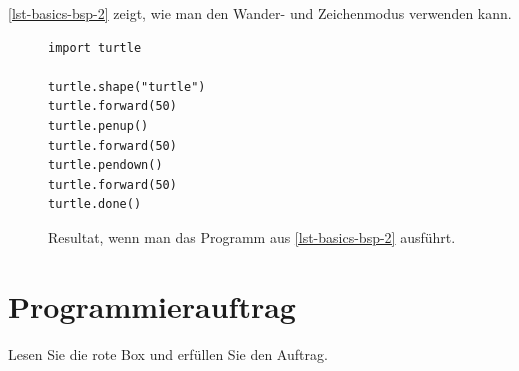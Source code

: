 \begin{example}

\autoref{lst-basics-bsp-2} zeigt, wie man den Wander- und Zeichenmodus verwenden kann.

\begin{figure}[htb]
\centering
\begin{minipage}{0.5\linewidth}
\centering
\begin{lstlisting}[caption={Beispielprogramm, welches die Figur aus \autoref{figure-basics-bsp-2} zeichnet (\graybgtexttt{bsp\_2.py}).}, label=lst-basics-bsp-2, showspaces=true]
import turtle

turtle.shape("turtle")
turtle.forward(50)
turtle.penup()
turtle.forward(50)
turtle.pendown()
turtle.forward(50)
turtle.done()
\end{lstlisting}
\end{minipage}
\hfill
\begin{minipage}[c]{0.4\linewidth}
\centering
{}
\caption{Resultat, wenn man das Programm aus \autoref{lst-basics-bsp-2} ausführt.}
\label{figure-basics-bsp-2}
\end{minipage}
\end{figure}

\end{example}

\section{Programmierauftrag}

Lesen Sie die rote Box und erfüllen Sie den Auftrag.

